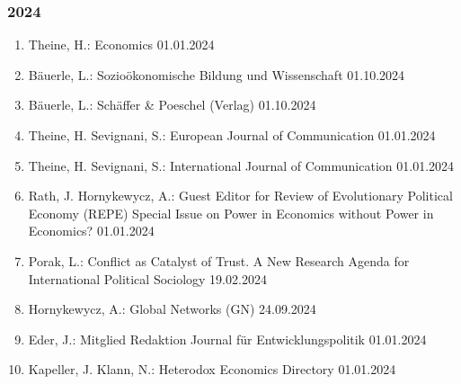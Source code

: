 \subsubsection*{2024}
\begin{enumerate}
	\item Theine, H.: Economics 01.01.2024
	\item Bäuerle, L.: Sozioökonomische Bildung und Wissenschaft 01.10.2024
	\item Bäuerle, L.: Schäffer \& Poeschel (Verlag) 01.10.2024
	\item Theine, H. Sevignani, S.: European Journal of Communication 01.01.2024
	\item Theine, H. Sevignani, S.: International Journal of Communication 01.01.2024
	\item Rath, J. Hornykewycz, A.: Guest Editor for Review of Evolutionary Political Economy (REPE) Special Issue on \glqq Power in Economics without Power in Economics?\grqq{} 01.01.2024
	\item Porak, L.: Conflict as Catalyst of Trust. A New Research Agenda for International Political Sociology 19.02.2024
	\item Hornykewycz, A.: Global Networks (GN) 24.09.2024
	\item Eder, J.: Mitglied Redaktion Journal für Entwicklungspolitik 01.01.2024
	\item Kapeller, J. Klann, N.: Heterodox Economics Directory 01.01.2024
\end{enumerate}
